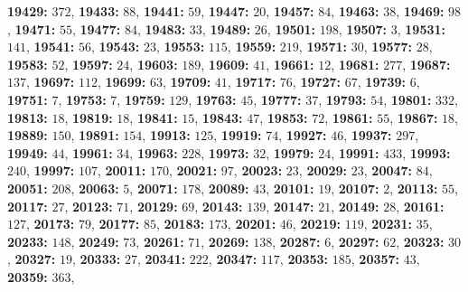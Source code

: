 \textsf{\bfseries 19429:} $372$, \textsf{\bfseries 19433:} $88$, \textsf{\bfseries 19441:} $59$, \textsf{\bfseries 19447:} $20$, \textsf{\bfseries 19457:} $84$, \textsf{\bfseries 19463:} $38$, \textsf{\bfseries 19469:} $98$, \textsf{\bfseries 19471:} $55$, \textsf{\bfseries 19477:} $84$, \textsf{\bfseries 19483:} $33$, \textsf{\bfseries 19489:} $26$, \textsf{\bfseries 19501:} $198$, \textsf{\bfseries 19507:} $3$, \textsf{\bfseries 19531:} $141$, \textsf{\bfseries 19541:} $56$, \textsf{\bfseries 19543:} $23$, \textsf{\bfseries 19553:} $115$, \textsf{\bfseries 19559:} $219$, \textsf{\bfseries 19571:} $30$, \textsf{\bfseries 19577:} $28$, \textsf{\bfseries 19583:} $52$, \textsf{\bfseries 19597:} $24$, \textsf{\bfseries 19603:} $189$, \textsf{\bfseries 19609:} $41$, \textsf{\bfseries 19661:} $12$, \textsf{\bfseries 19681:} $277$, \textsf{\bfseries 19687:} $137$, \textsf{\bfseries 19697:} $112$, \textsf{\bfseries 19699:} $63$, \textsf{\bfseries 19709:} $41$, \textsf{\bfseries 19717:} $76$, \textsf{\bfseries 19727:} $67$, \textsf{\bfseries 19739:} $6$, \textsf{\bfseries 19751:} $7$, \textsf{\bfseries 19753:} $7$, \textsf{\bfseries 19759:} $129$, \textsf{\bfseries 19763:} $45$, \textsf{\bfseries 19777:} $37$, \textsf{\bfseries 19793:} $54$, \textsf{\bfseries 19801:} $332$, \textsf{\bfseries 19813:} $18$, \textsf{\bfseries 19819:} $18$, \textsf{\bfseries 19841:} $15$, \textsf{\bfseries 19843:} $47$, \textsf{\bfseries 19853:} $72$, \textsf{\bfseries 19861:} $55$, \textsf{\bfseries 19867:} $18$, \textsf{\bfseries 19889:} $150$, \textsf{\bfseries 19891:} $154$, \textsf{\bfseries 19913:} $125$, \textsf{\bfseries 19919:} $74$, \textsf{\bfseries 19927:} $46$, \textsf{\bfseries 19937:} $297$, \textsf{\bfseries 19949:} $44$, \textsf{\bfseries 19961:} $34$, \textsf{\bfseries 19963:} $228$, \textsf{\bfseries 19973:} $32$, \textsf{\bfseries 19979:} $24$, \textsf{\bfseries 19991:} $433$, \textsf{\bfseries 19993:} $240$, \textsf{\bfseries 19997:} $107$, \textsf{\bfseries 20011:} $170$, \textsf{\bfseries 20021:} $97$, \textsf{\bfseries 20023:} $23$, \textsf{\bfseries 20029:} $23$, \textsf{\bfseries 20047:} $84$, \textsf{\bfseries 20051:} $208$, \textsf{\bfseries 20063:} $5$, \textsf{\bfseries 20071:} $178$, \textsf{\bfseries 20089:} $43$, \textsf{\bfseries 20101:} $19$, \textsf{\bfseries 20107:} $2$, \textsf{\bfseries 20113:} $55$, \textsf{\bfseries 20117:} $27$, \textsf{\bfseries 20123:} $71$, \textsf{\bfseries 20129:} $69$, \textsf{\bfseries 20143:} $139$, \textsf{\bfseries 20147:} $21$, \textsf{\bfseries 20149:} $28$, \textsf{\bfseries 20161:} $127$, \textsf{\bfseries 20173:} $79$, \textsf{\bfseries 20177:} $85$, \textsf{\bfseries 20183:} $173$, \textsf{\bfseries 20201:} $46$, \textsf{\bfseries 20219:} $119$, \textsf{\bfseries 20231:} $35$, \textsf{\bfseries 20233:} $148$, \textsf{\bfseries 20249:} $73$, \textsf{\bfseries 20261:} $71$, \textsf{\bfseries 20269:} $138$, \textsf{\bfseries 20287:} $6$, \textsf{\bfseries 20297:} $62$, \textsf{\bfseries 20323:} $30$, \textsf{\bfseries 20327:} $19$, \textsf{\bfseries 20333:} $27$, \textsf{\bfseries 20341:} $222$, \textsf{\bfseries 20347:} $117$, \textsf{\bfseries 20353:} $185$, \textsf{\bfseries 20357:} $43$, \textsf{\bfseries 20359:} $363$, 

